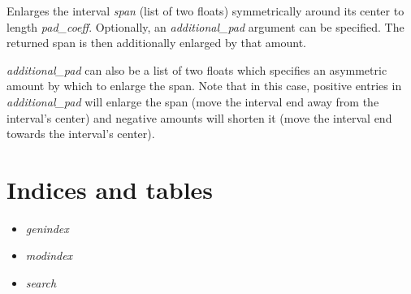 \documentclass[letterpaper,10pt,english]{sphinxmanual}
\begin{document}

\begin{fulllineitems}
\label{api/kafe:kafe.plot.pad_span}
Enlarges the interval \emph{span} (list of two floats) symmetrically around
its center to length \emph{pad\_coeff}. Optionally, an \emph{additional\_pad} argument
can be specified. The returned span is then additionally enlarged by that amount.

\emph{additional\_pad} can also be a list of two floats which specifies an asymmetric
amount by which to enlarge the span. Note that in this case, positive entries in
\emph{additional\_pad} will enlarge the span (move the interval end away from the
interval's center) and negative amounts will shorten it (move the interval end
towards the interval's center).

\end{fulllineitems}



\chapter{Indices and tables}
\label{index:indices-and-tables}\begin{itemize}
\item {} 
\emph{genindex}

\item {} 
\emph{modindex}

\item {} 
\emph{search}

\end{itemize}
\end{document}

